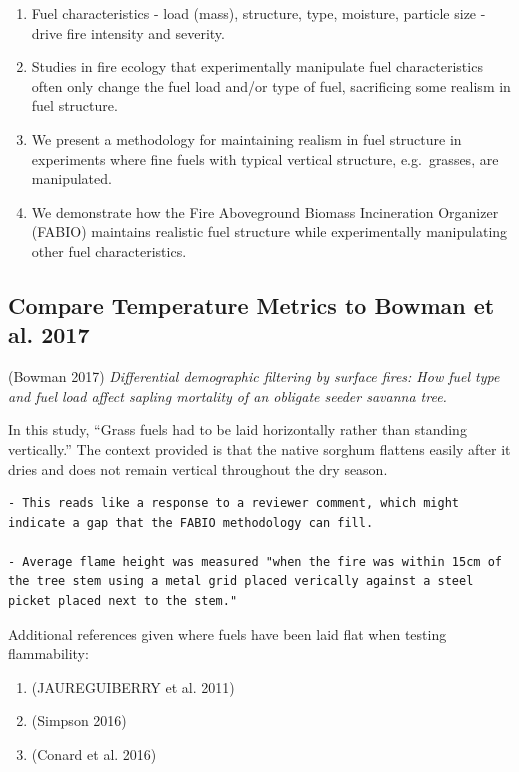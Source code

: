 \documentclass[11pt,a4paper]{article}
\begin{document}
\begin{enumerate}
\def\labelenumi{\arabic{enumi}.}
\item
  Fuel characteristics - load (mass), structure, type, moisture,
  particle size - drive fire intensity and severity.
\item
  Studies in fire ecology that experimentally manipulate fuel
  characteristics often only change the fuel load and/or type of fuel,
  sacrificing some realism in fuel structure.
\item
  We present a methodology for maintaining realism in fuel structure in
  experiments where fine fuels with typical vertical structure,
  e.g.~grasses, are manipulated.
\item
  We demonstrate how the Fire Aboveground Biomass Incineration Organizer
  (FABIO) maintains realistic fuel structure while experimentally
  manipulating other fuel characteristics.
\end{enumerate}

\subsection{Compare Temperature Metrics to Bowman et al.
2017}\label{compare-temperature-metrics-to-bowman-et-al.-2017}

(Bowman 2017) \emph{Differential demographic filtering by surface fires:
How fuel type and fuel load affect sapling mortality of an obligate
seeder savanna tree.}

In this study, ``Grass fuels had to be laid horizontally rather than
standing vertically.'' The context provided is that the native sorghum
flattens easily after it dries and does not remain vertical throughout
the dry season.

\begin{verbatim}
- This reads like a response to a reviewer comment, which might indicate a gap that the FABIO methodology can fill. 

- Average flame height was measured "when the fire was within 15cm of the tree stem using a metal grid placed verically against a steel picket placed next to the stem."
\end{verbatim}

Additional references given where fuels have been laid flat when testing
flammability:

\begin{enumerate}
\def\labelenumi{\arabic{enumi}.}
\item
  (JAUREGUIBERRY et al. 2011)
\item
  (Simpson 2016)
\item
  (Conard et al. 2016)
\end{enumerate}
\end{document}

